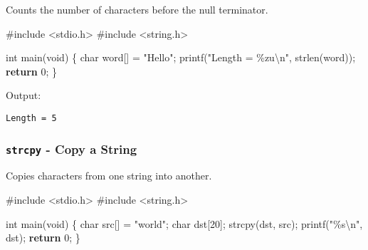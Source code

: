 \documentclass[
  letterpaper,
  DIV=11,
  numbers=noendperiod]{scrreprt}
\newenvironment{Shaded}{\begin{snugshade}}{\end{snugshade}}
\newcommand{\ControlFlowTok}[1]{\textcolor[rgb]{0.00,0.23,0.31}{\textbf{#1}}}
\newcommand{\DataTypeTok}[1]{\textcolor[rgb]{0.68,0.00,0.00}{#1}}
\newcommand{\DecValTok}[1]{\textcolor[rgb]{0.68,0.00,0.00}{#1}}
\newcommand{\ImportTok}[1]{\textcolor[rgb]{0.00,0.46,0.62}{#1}}
\newcommand{\NormalTok}[1]{\textcolor[rgb]{0.00,0.23,0.31}{#1}}
\newcommand{\OperatorTok}[1]{\textcolor[rgb]{0.37,0.37,0.37}{#1}}
\newcommand{\PreprocessorTok}[1]{\textcolor[rgb]{0.68,0.00,0.00}{#1}}
\newcommand{\SpecialCharTok}[1]{\textcolor[rgb]{0.37,0.37,0.37}{#1}}
\newcommand{\StringTok}[1]{\textcolor[rgb]{0.13,0.47,0.30}{#1}}
\begin{document}
Counts the number of characters before the null terminator.

\begin{Shaded}
\begin{Highlighting}[]
\PreprocessorTok{\#include }\ImportTok{\textless{}stdio.h\textgreater{}}
\PreprocessorTok{\#include }\ImportTok{\textless{}string.h\textgreater{}}

\DataTypeTok{int}\NormalTok{ main}\OperatorTok{(}\DataTypeTok{void}\OperatorTok{)} \OperatorTok{\{}
    \DataTypeTok{char}\NormalTok{ word}\OperatorTok{[]} \OperatorTok{=} \StringTok{"Hello"}\OperatorTok{;}
\NormalTok{    printf}\OperatorTok{(}\StringTok{"Length = }\SpecialCharTok{\%zu\textbackslash{}n}\StringTok{"}\OperatorTok{,}\NormalTok{ strlen}\OperatorTok{(}\NormalTok{word}\OperatorTok{));}
    \ControlFlowTok{return} \DecValTok{0}\OperatorTok{;}
\OperatorTok{\}}
\end{Highlighting}
\end{Shaded}

Output:

\begin{verbatim}
Length = 5
\end{verbatim}

\subsubsection{\texorpdfstring{\texttt{strcpy} - Copy a
String}{strcpy - Copy a String}}\label{strcpy---copy-a-string}

Copies characters from one string into another.

\begin{Shaded}
\begin{Highlighting}[]
\PreprocessorTok{\#include }\ImportTok{\textless{}stdio.h\textgreater{}}
\PreprocessorTok{\#include }\ImportTok{\textless{}string.h\textgreater{}}

\DataTypeTok{int}\NormalTok{ main}\OperatorTok{(}\DataTypeTok{void}\OperatorTok{)} \OperatorTok{\{}
    \DataTypeTok{char}\NormalTok{ src}\OperatorTok{[]} \OperatorTok{=} \StringTok{"world"}\OperatorTok{;}
    \DataTypeTok{char}\NormalTok{ dst}\OperatorTok{[}\DecValTok{20}\OperatorTok{];}
\NormalTok{    strcpy}\OperatorTok{(}\NormalTok{dst}\OperatorTok{,}\NormalTok{ src}\OperatorTok{);}
\NormalTok{    printf}\OperatorTok{(}\StringTok{"}\SpecialCharTok{\%s\textbackslash{}n}\StringTok{"}\OperatorTok{,}\NormalTok{ dst}\OperatorTok{);}
    \ControlFlowTok{return} \DecValTok{0}\OperatorTok{;}
\OperatorTok{\}}
\end{Highlighting}
\end{Shaded}
\end{document}
